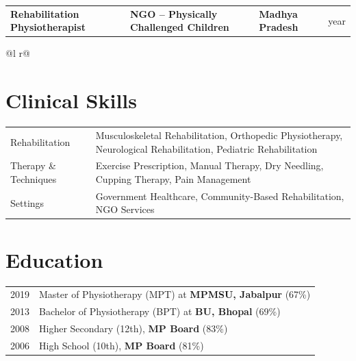 \documentclass[a4paper,10pt]{article}
\newcommand{\customHeading}[1]{
    \section{\texorpdfstring{#1 \hrulefill}{}}
}
\newcommand{\customSubHeading}[4]{
    \begin{tabularx}{1.0\textwidth} {
           >{\raggedright\arraybackslash}X
           >{\raggedleft\arraybackslash}X
           >{\raggedleft\arraybackslash}X
           >{\raggedleft\arraybackslash}X  }
          \textbf{#1} &\textbf{#2} & \textbf{#3} & #4 \\[2.0pt]
    \end{tabularx}
}
\begin{document}
\customSubHeading{Rehabilitation Physiotherapist}
{NGO -- Physically Challenged Children}
{Madhya Pradesh}{1 year}
\begin{tabularx}{\linewidth}{ @{}l r@{} }
\end{tabularx}


\customHeading{Clinical Skills}
\begin{tabularx}{\linewidth}{@{}l X@{}}
Rehabilitation  &  \normalsize{Musculoskeletal Rehabilitation, Orthopedic Physiotherapy, Neurological Rehabilitation, Pediatric Rehabilitation}\\

Therapy \& Techniques  &  \normalsize{Exercise Prescription, Manual Therapy, Dry Needling, Cupping Therapy, Pain Management}\\

Settings  &  \normalsize{Government Healthcare, Community-Based Rehabilitation, NGO Services}\\
\end{tabularx}


\customHeading{Education}
\begin{tabularx}{\linewidth}{@{}l X@{}}
2019 & Master of Physiotherapy (MPT) at \textbf{MPMSU, Jabalpur} \hfill \normalsize (67\%) \\[3.0pt]

2013 & Bachelor of Physiotherapy (BPT) at \textbf{BU, Bhopal} \hfill \normalsize (69\%) \\[3.0pt]

2008 & Higher Secondary (12th), \textbf{MP Board} \hfill \normalsize (83\%) \\[3.0pt]

2006 & High School (10th), \textbf{MP Board} \hfill \normalsize (81\%) \\
\end{tabularx}
\end{document}
